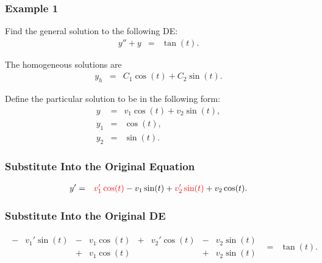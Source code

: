 \begin{frame}
  \frametitle{Example 1}
  Find the general solution to the following DE:
  \begin{eqnarray*}
    y'' + y & = & \tan(t).
  \end{eqnarray*}

  {
    The homogeneous solutions are
    \begin{eqnarray*}
      y_h & = & C_1 \cos(t) + C_2 \sin(t).
    \end{eqnarray*}
  }

  {
    Define the particular solution to be in the following form:
    \begin{eqnarray*}
      y & = & v_1 \cos(t) + v_2 \sin(t), \\
      y_1 & = & \cos(t), \\
      y_2 & = & \sin(t).
    \end{eqnarray*}
  }

\end{frame}

\begin{frame}
  \frametitle{Substitute Into the Original Equation}

  \begin{eqnarray*}
    y' & = & {\color{red}v_1' \cos(t)} - v_1 \sin(t) + {\color{red}v_2' \sin(t)} + v_2 \cos(t).
  \end{eqnarray*}




\end{frame}

\begin{frame}
  \frametitle{Substitute Into the Original DE}

  \begin{eqnarray*}
    \begin{array}{rccccccc}
    - & v_1' \sin(t) & - & v_1 \cos(t) & + & v_2' \cos(t) & - & v_2 \sin(t) \\
    & & + & v_1 \cos(t)  & & & + & v_2 \sin(t) 
  \end{array}
  & = & \tan(t).
  \end{eqnarray*}


\end{frame}

